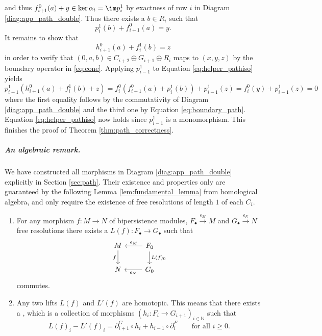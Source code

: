 and thus $f^0_{i+1}(a)+y\in \ker \alpha_i = \im p^1_i$ by exactness of row $i$ in Diagram \eqref{diag:app_path_double}. Thus there exists a $b\in R_i$ such that
\begin{equation*}
    p^1_i(b)+f^0_{i+1}(a)=y.
\end{equation*}
It remains to show that 
\begin{equation}
    \label{eq:helper_pathiso}
    h^0_{i+1}(a)+f^1_i(b)=z
\end{equation}
in order to verify that $(0,a,b)\in C_{i+2}\oplus G_{i+1}\oplus R_{i}$ maps to $(x,y,z)$ by the boundary operator in \eqref{eq:cone}. Applying $p^1_{i-1}$ to Equation \eqref{eq:helper_pathiso} yields
\begin{equation*}
    p^1_{i-1}(h^0_{i+1}(a)+f^1_i(b)+z)=f^0_i(f^0_{i+1}(a)+p^1_i(b))+p^1_{i-1}(z) =                       f^0_i(y)+p^1_{i-1}(z) =0
\end{equation*}
where the first equality follows by the commutativity of Diagram \eqref{diag:app_path_double} and the third one by Equation \eqref{eq:boundary_path}. Equation \eqref{eq:helper_pathiso} now holds since $p^1_{i-1}$ is a monomorphism. This finishes the proof of Theorem \ref{thm:path_correctness}. 
%
\subparagraph{An algebraic remark.}
%
We have constructed all morphisms in Diagram \eqref{diag:app_path_double} explicitly in Section \ref{sec:path}. Their existence and properties only are guaranteed by the following Lemma \ref{lem:fundamental_lemma} from homological algebra, and only require the existence of free resolutions of length $1$ of each $C_i$.
\begin{lemma}
    \label{lem:fundamental_lemma}
    \begin{enumerate}[label=(\roman*)]
        \item For any morphism $f:M\rightarrow N$ of bipersistence modules, $F_\bullet\xrightarrow{\epsilon_M} M$ and $G_\bullet \xrightarrow{\epsilon_N} N$ free resolutions there exists a  $L(f):F_\bullet \rightarrow G_\bullet$ such that 
        \begin{equation*}
            \begin{tikzcd}
M \arrow[d, "f"'] & F_0 \arrow[l, "\epsilon_M"'] \arrow[d, "L(f)_0"] \\
N                 & G_0 \arrow[l, "\epsilon_N"]                     
\end{tikzcd}
        \end{equation*}
        commutes. 
        \item Any two lifts $L(f)$ and $L'(f)$ are homotopic. This means that there exists a , which is a collection of morphisms $(h_i:F_i\rightarrow G_{i+1})_{i\in \mathbb{N}}$ such that 
        \begin{equation*}
        L(f)_i-L'(f)_i=\partial^G_{i+1}\circ h_i+h_{i-1}\circ \partial^F_i \qquad \text{for all }i\geq 0.
        \end{equation*}
    \end{enumerate} 
\end{lemma}

